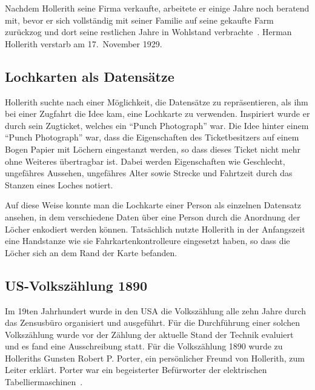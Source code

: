 \documentclass[parskip=half]{scrartcl}
\begin{document}
Nachdem Hollerith seine Firma verkaufte, arbeitete er einige Jahre noch
beratend mit, bevor er sich vollständig mit seiner Familie auf seine gekaufte
Farm zurückzog und dort seine restlichen Jahre in Wohlstand
verbrachte~\cite{austrian1982herman}. Herman Hollerith verstarb am 17.~November
1929.

\subsection{Lochkarten als Datensätze}
\label{sec:lochkarten}

Hollerith suchte nach einer Möglichkeit, die Datensätze zu repräsentieren, als
ihm bei einer Zugfahrt die Idee kam, eine Lochkarte zu verwenden. Inspiriert
wurde er durch sein Zugticket, welches ein \enquote{Punch Photograph} war. Die
Idee hinter einem \enquote{Punch Photograph} war, dass die Eigenschaften des
Ticketbesitzers auf einem Bogen Papier mit Löchern eingestanzt werden, so dass
dieses Ticket nicht mehr ohne Weiteres übertragbar ist. Dabei werden
Eigenschaften wie Geschlecht, ungefähres Aussehen, ungefähres Alter sowie
Strecke und Fahrtzeit durch das Stanzen eines Loches notiert.

Auf diese Weise konnte man die Lochkarte einer Person als einzelnen Datensatz
ansehen, in dem verschiedene Daten über eine Person durch die Anordnung der
Löcher enkodiert werden können. Tatsächlich nutzte Hollerith in der Anfangszeit
eine Handstanze wie sie Fahrkartenkontrolleure eingesetzt haben, so dass die
Löcher sich an dem Rand der Karte befanden.

\subsection{US-Volkszählung 1890}
\label{sec:1890}

Im 19ten Jahrhundert wurde in den USA die Volkszählung alle zehn Jahre durch
das Zensusbüro organisiert und ausgeführt. Für die Durchführung einer solchen
Volkszählung wurde vor der Zählung der aktuelle Stand der Technik evaluiert und
es fand eine Ausschreibung statt. Für die Volkszählung 1890 wurde zu Holleriths
Gunsten Robert P. Porter, ein persönlicher Freund von Hollerith, zum Leiter
erklärt. Porter war ein begeisterter Befürworter der elektrischen
Tabelliermaschinen~\cite{austrian1982herman}.
\end{document}
